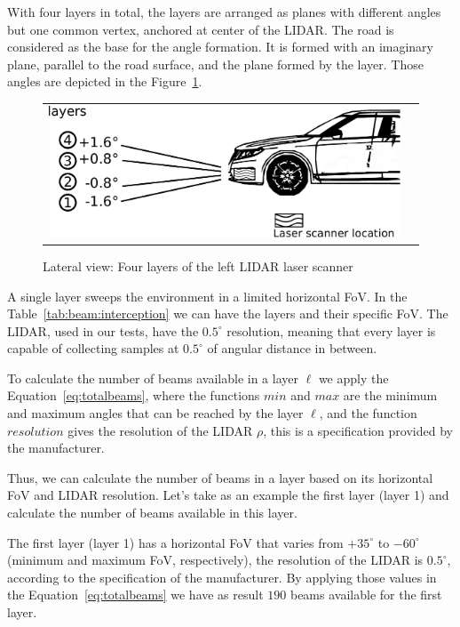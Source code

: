 With four layers in total, the layers are arranged as planes with different angles but one common vertex, anchored at center of the LIDAR. The road is considered as the base for the angle formation. It is formed with an imaginary plane, parallel to the road surface, and the plane formed by the layer. Those angles are depicted in the Figure~\ref{fig:demonstrator:lateral}.

\begin{figure}[h]
   \centering
     \begin{tabular}{lr}
       \includegraphics[scale=0.5]{img/fig:demonstrator:lateral}
     \end{tabular}
   \caption{Lateral view: Four layers of the left LIDAR laser scanner}
   \label{fig:demonstrator:lateral}
\end{figure}

A single layer sweeps the environment in a limited horizontal FoV. In the Table~\ref{tab:beam:interception} we can have the layers and their specific FoV. The LIDAR, used in our tests, have the $0.5^{\circ}$ resolution, meaning that every layer is capable of collecting samples at $0.5^{\circ}$ of angular distance in between. 

To calculate the number of beams available in a layer $\ell$ we apply the Equation~\ref{eq:totalbeams}, where the functions $min$ and $max$ are the minimum and maximum angles that can be reached by the layer $\ell$, and the function $resolution$ gives the resolution of the LIDAR $\rho$, this is a specification provided by the manufacturer. 

Thus, we can calculate the number of beams in a layer based on its horizontal FoV and LIDAR resolution. Let's take as an example the first layer (layer 1) and calculate the number of beams available in this layer. 

The first layer (layer 1) has a horizontal FoV that varies from $+35^\circ$ to $-60^\circ$ (minimum and maximum FoV, respectively), the resolution of the LIDAR is $0.5^\circ$, according to the specification of the manufacturer. By applying those values in the Equation~\ref{eq:totalbeams} we have as result $190$ beams available for the first layer.

